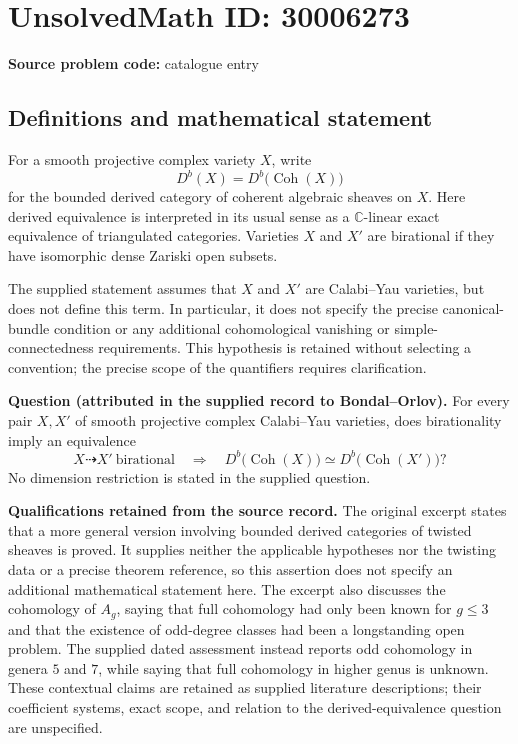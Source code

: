 \documentclass[11pt]{article}
\newcommand{\C}{\mathbb{C}}
\begin{document}
\section*{UnsolvedMath ID: 30006273}
\textbf{Source problem code:} catalogue entry
\subsection{Definitions and mathematical statement}
For a smooth projective complex variety \(X\), write
\[
D^b(X)=D^b\bigl(\operatorname{Coh}(X)\bigr)
\]
for the bounded derived category of coherent algebraic sheaves on \(X\). Here derived equivalence is interpreted in its usual sense as a \(\C\)-linear exact equivalence of triangulated categories. Varieties \(X\) and \(X'\) are birational if they have isomorphic dense Zariski open subsets.

The supplied statement assumes that \(X\) and \(X'\) are Calabi--Yau varieties, but does not define this term. In particular, it does not specify the precise canonical-bundle condition or any additional cohomological vanishing or simple-connectedness requirements. This hypothesis is retained without selecting a convention; the precise scope of the quantifiers requires clarification.

\textbf{Question (attributed in the supplied record to Bondal--Orlov).} For every pair \(X,X'\) of smooth projective complex Calabi--Yau varieties, does birationality imply an equivalence
\[
X\dashrightarrow X'\ \text{birational}
\quad\Longrightarrow\quad
D^b\bigl(\operatorname{Coh}(X)\bigr)
\simeq
D^b\bigl(\operatorname{Coh}(X')\bigr)?
\]
No dimension restriction is stated in the supplied question.

\textbf{Qualifications retained from the source record.} The original excerpt states that a more general version involving bounded derived categories of twisted sheaves is proved. It supplies neither the applicable hypotheses nor the twisting data or a precise theorem reference, so this assertion does not specify an additional mathematical statement here. The excerpt also discusses the cohomology of \(A_g\), saying that full cohomology had only been known for \(g\leq 3\) and that the existence of odd-degree classes had been a longstanding open problem. The supplied dated assessment instead reports odd cohomology in genera \(5\) and \(7\), while saying that full cohomology in higher genus is unknown. These contextual claims are retained as supplied literature descriptions; their coefficient systems, exact scope, and relation to the derived-equivalence question are unspecified.
\end{document}
